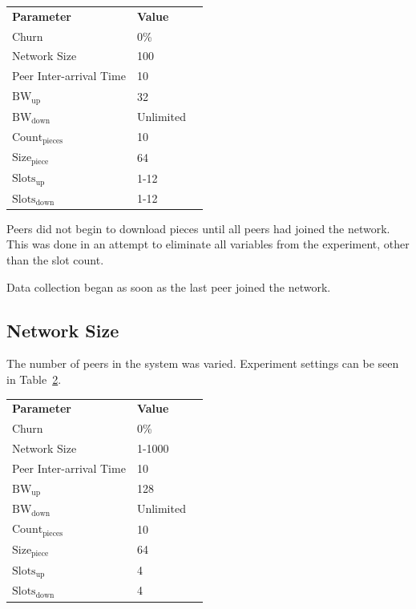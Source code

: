 \documentclass[a4paper,12pt,twocolumn]{article}
\newcommand{\tref}[1]{Table~\ref{#1}}
\begin{document}
\begin{table}[!htbp]
\centering
\footnotesize
\begin{tabular}{lll}
\textbf{Parameter} & \textbf{Value} \\
Churn & 0\% \\
Network Size & 100 \\
Peer Inter-arrival Time & 10 \\
$\text{BW}_{\text{up}}$ & 32 \\
$\text{BW}_{\text{down}}$ & Unlimited \\
$\text{Count}_{\text{pieces}}$ & 10 \\
$\text{Size}_{\text{piece}}$ & 64 \\
$\text{Slots}_{\text{up}}$ & 1-12 \\
$\text{Slots}_{\text{down}}$ & 1-12 \\
\end{tabular}
\label{tab:slots}
\end{table}

Peers did not begin to download pieces until all peers had joined the network.
This was done in an attempt to eliminate all variables from the experiment, other than the slot count.

Data collection began as soon as the last peer joined the network.

\subsection{Network Size}
\label{subsec:network_size}
The number of peers in the system was varied. Experiment settings can be seen in \tref{tab:network_size}.

\begin{table}[ht!]
\centering
\footnotesize
\begin{tabular}{lll}
\textbf{Parameter} & \textbf{Value} \\
Churn & 0\% \\
Network Size & 1-1000 \\
Peer Inter-arrival Time & 10 \\
$\text{BW}_{\text{up}}$ & 128 \\
$\text{BW}_{\text{down}}$ & Unlimited \\
$\text{Count}_{\text{pieces}}$ & 10 \\
$\text{Size}_{\text{piece}}$ & 64 \\
$\text{Slots}_{\text{up}}$ & 4 \\
$\text{Slots}_{\text{down}}$ & 4 \\
\end{tabular}
\label{tab:network_size}
\end{table}
\end{document}
